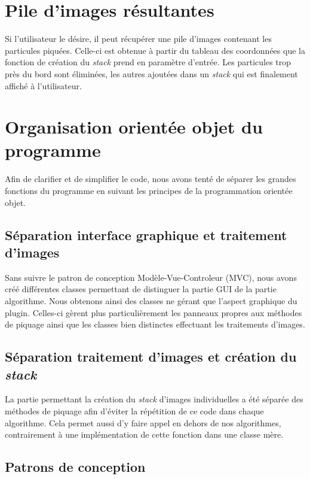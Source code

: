 \section{Pile d'images résultantes}

Si l'utilisateur le désire, il peut récupérer une pile d'images contenant les particules piquées. Celle-ci est obtenue à partir du tableau des coordonnées que la fonction de création du \textit{stack} prend en paramètre d'entrée.
Les particules trop près du bord sont éliminées, les autres ajoutées dans un \textit{stack} qui est finalement affiché à l'utilisateur.

\section{Organisation orientée objet du programme}

Afin de clarifier et de simplifier le code, nous avons tenté de séparer les grandes fonctions du programme en suivant les principes de la programmation orientée objet.

\subsection{Séparation interface graphique et traitement d'images}

Sans suivre le patron de conception Modèle-Vue-Controleur (MVC), nous avons créé différentes classes permettant de distinguer la partie GUI de la partie algorithme. Nous obtenons ainsi des classes ne gérant que l'aspect graphique du plugin. Celles-ci gèrent plus particulièrement les panneaux propres aux méthodes de piquage ainsi que les classes bien distinctes effectuant les traitements d'images.

\subsection{Séparation traitement d'images et création du \textit{stack}}

La partie permettant la création du \textit{stack} d'images individuelles a été séparée des méthodes de piquage afin d'éviter la répétition de ce code dans chaque algorithme. Cela permet aussi d'y faire appel en dehors de nos algorithmes, contrairement à une implémentation de cette fonction dans une classe mère.

\subsection{Patrons de conception}


